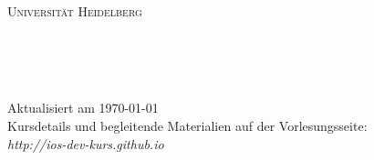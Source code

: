 \begin{titlepage}

\begin{center}

\makeatletter

\textsc{
{\LARGE Universität Heidelberg}\\[0.4cm]
{\Large \semester}
}\\[6cm]

{\Huge \bfseries \@title}\\[1cm]
\textsc{\LARGE \@subtitle}



\vfill


\textsc{\Large \@author\\[1.5cm]}

\begin{minipage}{\textwidth}
\begin{flushleft} \large
{\large
Aktualisiert am \today\\
Kursdetails und begleitende Materialien auf der Vorlesungsseite:\\
\emph{http://ios-dev-kurs.github.io}
}
\end{flushleft}
\end{minipage}


\makeatother

\end{center}

\end{titlepage}
